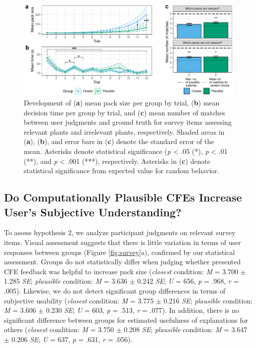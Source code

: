 \begin{figure}
   \centering
   \includegraphics[width=\textwidth]{./media/H1_p_ShubsPerTrial_RTPertrial_PAZ_FINAL.pdf}
   \caption{Development of (\textbf{a}) mean pack size per group by trial, (\textbf{b}) mean decision time per group by trial, and (\textbf{c}) mean number of matches between user judgments and ground truth for survey items assessing relevant plants and irrelevant plants, respectively. Shaded areas in (\textbf{a}), (\textbf{b}), and error bars in (\textbf{c}) denote the standard error of the mean. Asterisks denote statistical significance (\textit{p} < .05 (*), \textit{p} < .01 (**), and \textit{p} < .001 (***), respectively. Asterisks in (\textbf{c}) denote statistical significance from expected value for random behavior.}
   \label{fig:hyp1}
 \end{figure}

\subsection{Do Computationally Plausible CFEs Increase User's Subjective Understanding?}
To assess hypothesis 2, we analyze participant judgments on relevant survey items.
Visual assessment suggests that there is little variation in terms of user responses between groups (Figure \ref{fig:survey}a), confirmed by our statistical assessment. 
Groups do not statistically differ when judging whether presented \gls{CFE} feedback was helpful to increase pack size (\textit{closest} condition: \textit{M} = 3.700 $\pm$ 1.285 \textit{SE}; \textit{plausible} condition: \textit{M} = 3.636 $\pm$ 0.242 \textit{SE}; \textit{U} = 656, \textit{p} = .968, \textit{r} = .005).
Likewise, we do not detect significant group differences in terms of subjective usability (\textit{closest} condition: \textit{M} = 3.775 $\pm$ 0.216 \textit{SE}; \textit{plausible} condition: \textit{M} = 3.606 $\pm$ 0.230 \textit{SE}; \textit{U} = 603, \textit{p} = .513, \textit{r} = .077).
In addition, there is no significant difference between groups for estimated usefulness of explanations for others (\textit{closest} condition: \textit{M} = 3.750 $\pm$ 0.208 \textit{SE}; \textit{plausible} condition: \textit{M} = 3.647 $\pm$ 0.206 \textit{SE}; \textit{U} = 637, \textit{p} = .631, \textit{r} = .056).


